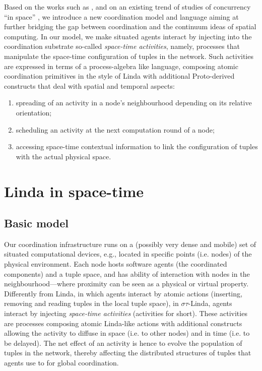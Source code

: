 \documentclass[12pt,a4paper,twoside,openright]{book}
\begin{document}
Based on the works such as \cite{VCMZ-TAAS2011,mamei2009acm,klaim,GeoLinda}, and on an existing trend of studies of concurrency ``in space'' \cite{ambients,CardelliG10,SpatialComputing,proto}, we introduce a new coordination model and language aiming at further bridging the gap between coordination and the continuum ideas of spatial computing.
%
In our model, we make situated agents interact by injecting into the coordination substrate so-called \emph{space-time activities}, namely, processes that manipulate the space-time configuration of tuples in the network.
%
Such activities are expressed in terms of a process-algebra like language, composing atomic coordination primitives in the style of Linda with additional Proto-derived constructs that deal with spatial and temporal aspects:
\begin{enumerate}
 \item spreading of an activity in a node's neighbourhood depending on its relative orientation;
 \item scheduling an activity at the next computation round of a node;
 \item accessing space-time contextual information to link the configuration of tuples with the actual physical space.
\end{enumerate}

\section{Linda in space-time}

\subsection{Basic model}

Our coordination infrastructure runs on a (possibly very dense and mobile) set of situated computational devices, e.g., located in specific points (i.e. nodes) of the physical environment. 
%
Each node hosts software agents (the coordinated components) and a tuple space, and has ability of interaction with nodes in the neighbourhood---where proximity can be seen as a physical or virtual property.
%
Differently from Linda, in which agents interact by atomic actions (inserting, removing and reading tuples in the local tuple space), in $\sigma\tau$-Linda, agents interact by injecting \emph{space-time activities} (activities for short).
%
These activities are processes composing atomic Linda-like actions with additional constructs allowing the activity to diffuse in space (i.e. to other nodes) and in time (i.e. to be delayed).
%
The net effect of an activity is hence to evolve the population of tuples in the network, thereby affecting the distributed structures of tuples that agents use to for global coordination.
\end{document}
